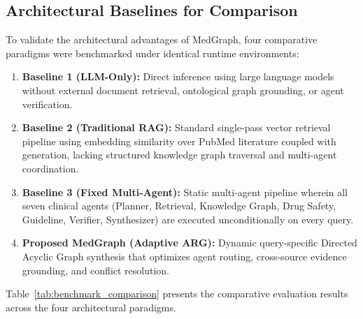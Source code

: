 \documentclass[conference]{IEEEtran}
\begin{document}
\subsection{Architectural Baselines for Comparison}

To validate the architectural advantages of MedGraph, four comparative paradigms were benchmarked under identical runtime environments:
\begin{enumerate}
    \item \textbf{Baseline 1 (LLM-Only):} Direct inference using large language models without external document retrieval, ontological graph grounding, or agent verification.
    \item \textbf{Baseline 2 (Traditional RAG):} Standard single-pass vector retrieval pipeline using embedding similarity over PubMed literature coupled with generation, lacking structured knowledge graph traversal and multi-agent coordination.
    \item \textbf{Baseline 3 (Fixed Multi-Agent):} Static multi-agent pipeline wherein all seven clinical agents (Planner, Retrieval, Knowledge Graph, Drug Safety, Guideline, Verifier, Synthesizer) are executed unconditionally on every query.
    \item \textbf{Proposed MedGraph (Adaptive ARG):} Dynamic query-specific Directed Acyclic Graph synthesis that optimizes agent routing, cross-source evidence grounding, and conflict resolution.
\end{enumerate}

Table~\ref{tab:benchmark_comparison} presents the comparative evaluation results across the four architectural paradigms.
\end{document}
